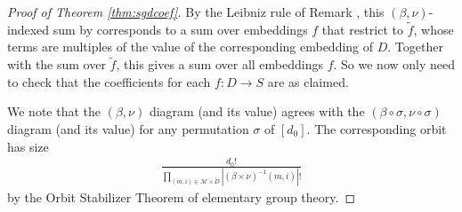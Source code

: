 \documentclass{article}
\theoremstyle{plain}
\theoremstyle{definition}
\newcommand{\wabs}[1]{\left|#1\right|}
\newcommand{\Mm}{\mathcal{M}}
\begin{document}
\begin{proof}[Proof of Theorem \ref{thm:sgdcoef}]
            By the Leibniz rule of Remark \label{rmk:leibniz}, this $(\beta,
            \nu)$-indexed sum by corresponds to a sum over embeddings $f$ that
            restrict to $\tilde f$, whose terms are multiples of the value of
            the corresponding embedding of $D$.  Together with the sum over
            $\tilde f$, this gives a sum over all embeddings $f$.  So we now
            only need to check that the coefficients for each $f:D\to S$ are as
            claimed.

            We note that the $(\beta, \nu)$ diagram (and its value) agrees with
            the $(\beta \circ \sigma, \nu \circ \sigma)$ diagram (and its
            value) for any permutation $\sigma$ of $[d_0]$.  The corresponding
            orbit has size
            \begin{align*}
                \frac{d_0!}{
                    \prod_{(m, i) \in \Mm \times \tilde D}
                        \wabs{(\beta \times \nu)^{-1}(m, i)}!
                }
            \end{align*}
            by the Orbit Stabilizer Theorem of elementary group theory.   


\end{proof}
\end{document}

